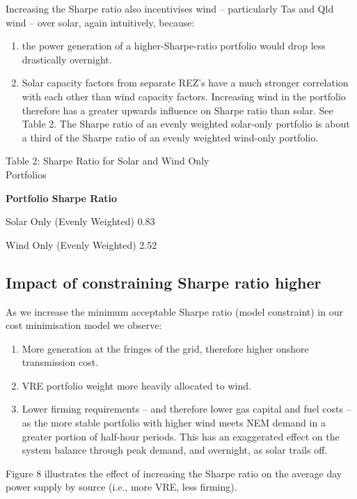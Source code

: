 \documentclass[
  letterpaper,
  DIV=11,
  numbers=noendperiod]{scrartcl}
\begin{document}
Increasing the Sharpe ratio also incentivises wind -- particularly Tas
and Qld wind -- over solar, again intuitively, because:

\begin{enumerate}
\def\labelenumi{(\alph{enumi})}
\item
  the power generation of a higher-Sharpe-ratio portfolio would drop
  less drastically overnight.
\item
  Solar capacity factors from separate REZ's have a much stronger
  correlation with each other than wind capacity factors. Increasing
  wind in the portfolio therefore has a greater upwards influence on
  Sharpe ratio than solar. See Table 2. The Sharpe ratio of an evenly
  weighted solar-only portfolio is about a third of the Sharpe ratio of
  an evenly weighted wind-only portfolio.
\end{enumerate}

Table 2: Sharpe Ratio for Solar and Wind Only\\
Portfolios

\textbf{Portfolio Sharpe Ratio}

Solar Only (Evenly Weighted) 0.83

Wind Only (Evenly Weighted) 2.52

\subsection{Impact of constraining Sharpe ratio
higher}\label{impact-of-constraining-sharpe-ratio-higher}

As we increase the minimum acceptable Sharpe ratio (model constraint) in
our cost minimisation model we observe:

\begin{enumerate}
\def\labelenumi{\arabic{enumi}.}
\item
  More generation at the fringes of the grid, therefore higher onshore
  transmission cost.
\item
  VRE portfolio weight more heavily allocated to wind.
\item
  Lower firming requirements -- and therefore lower gas capital and fuel
  costs -- as the more stable portfolio with higher wind meets NEM
  demand in a greater portion of half-hour periods. This has an
  exaggerated effect on the system balance through peak demand, and
  overnight, as solar trails off.
\end{enumerate}

Figure 8 illustrates the effect of increasing the Sharpe ratio on the
average day power supply by source (i.e., more VRE, less firming).
\end{document}
